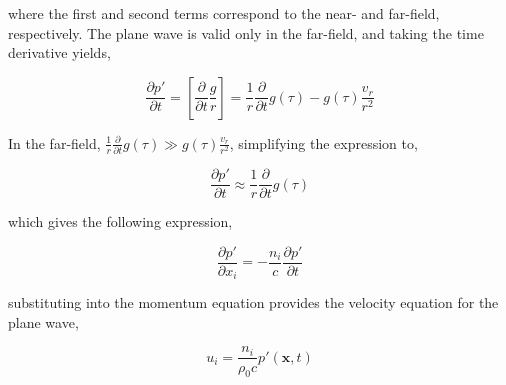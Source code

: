 where the first and second terms correspond to the near- and far-field, respectively. The plane wave is valid only in the far-field, and taking the time derivative yields,

\begin{equation*}
    \frac{\partial p'}{\partial t} = \left[ 
    \frac{\partial}{\partial t} \frac{g}{r}
    \right]
    = \frac{1}{r} \frac{\partial}{\partial t} g(\tau) - g(\tau) \frac{v_r}{r^2}
\end{equation*}

In the far-field, $\frac{1}{r}\frac{\partial}{\partial t}g(\tau) \gg g(\tau) \frac{v_r}{r^2}$, simplifying the expression to,

\begin{equation*}
    \frac{\partial p'}{\partial t} \approx \frac{1}{r}\frac{\partial}{\partial t} g(\tau)
\end{equation*}

which gives the following expression,

\begin{equation*}
    \frac{\partial p'}{\partial x_i} = -\frac{n_i}{c} \frac{\partial p'}{\partial t}
\end{equation*}

substituting into the momentum equation provides the velocity equation for the plane wave,

\begin{equation}
    u_i = \frac{n_i}{\rho_0c}p'(\bm{x},t)
\end{equation}